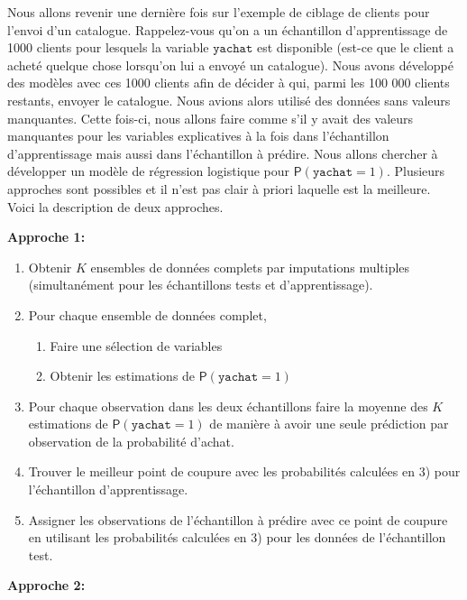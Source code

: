 \documentclass[
  11pt,
  letterpaper,
]{book}
\providecommand{\tightlist}{%
  \setlength{\itemsep}{0pt}\setlength{\parskip}{0pt}}
\theoremstyle{definition}
\theoremstyle{definition}
\theoremstyle{definition}
\theoremstyle{definition}
\theoremstyle{remark}
\begin{document}
Nous allons revenir une dernière fois sur l'exemple de ciblage de clients pour l'envoi d'un catalogue. Rappelez-vous qu'on a un échantillon d'apprentissage de 1000 clients pour lesquels la variable \(\texttt{yachat}\) est disponible (est-ce que le client a acheté quelque chose lorsqu'on lui a envoyé un catalogue). Nous avons développé des modèles avec ces 1000 clients afin de décider à qui, parmi les 100 000 clients restants, envoyer le catalogue. Nous avions alors utilisé des données sans valeurs manquantes. Cette fois-ci, nous allons faire comme s'il y avait des valeurs manquantes pour les variables explicatives à la fois dans l'échantillon d'apprentissage mais aussi dans l'échantillon à prédire. Nous allons chercher à développer un modèle de régression logistique pour \({\mathsf P}\left(\texttt{yachat}=1\right)\). Plusieurs approches sont possibles et il n'est pas clair à priori laquelle est la meilleure. Voici la description de deux approches.

\textbf{Approche 1: }

\begin{enumerate}
\def\labelenumi{\arabic{enumi})}
\tightlist
\item
  Obtenir \(K\) ensembles de données complets par imputations multiples (simultanément pour les échantillons tests et d'apprentissage).
\item
  Pour chaque ensemble de données complet,

  \begin{enumerate}
  \def\labelenumii{\alph{enumii}.}
  \tightlist
  \item
    Faire une sélection de variables
  \item
    Obtenir les estimations de \({\mathsf P}\left(\texttt{yachat}=1\right)\)
  \end{enumerate}
\item
  Pour chaque observation dans les deux échantillons faire la moyenne des \(K\) estimations de \({\mathsf P}\left(\texttt{yachat}=1\right)\) de manière à avoir une seule prédiction par observation de la probabilité d'achat.
\item
  Trouver le meilleur point de coupure avec les probabilités calculées en 3) pour l'échantillon d'apprentissage.
\item
  Assigner les observations de l'échantillon à prédire avec ce point de coupure en utilisant les probabilités calculées en 3) pour les données de l'échantillon test.
\end{enumerate}

\textbf{Approche 2:}
\end{document}
